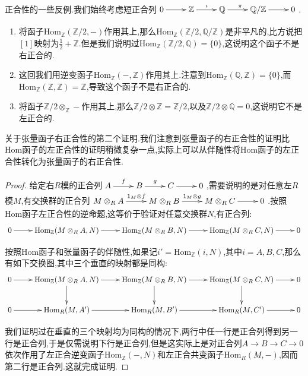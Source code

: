 正合性的一些反例.我们始终考虑短正合列$\xymatrix{0\ar[r]&\mathbb{Z}\ar[r]^{\iota}&\mathbb{Q}\ar[r]^{\pi}&\mathbb{Q}/\mathbb{Z}\ar[r]&0}$.
\begin{enumerate}
	\item 将函子$\mathrm{Hom}_{\mathbb{Z}}(\mathbb{Z}/2,-)$作用其上,那么$\mathrm{Hom}_{\mathbb{Z}}(\mathbb{Z}/2,\mathbb{Q}/\mathbb{Z})$是非平凡的,比方说把$[1]$映射为$\frac{1}{2}+\mathbb{Z}$.但是我们说明过$\mathrm{Hom}_{\mathbb{Z}}(\mathbb{Z}/2,\mathbb{Q})=\{0\}$,这说明这个函子不是右正合的.
	\item 这回我们用逆变函子$\mathrm{Hom}_{\mathbb{Z}}(-,\mathbb{Z})$作用其上.注意到$\mathrm{Hom}_{\mathbb{Z}}(\mathbb{Q},\mathbb{Z})=\{0\}$,而$\mathrm{Hom}_{\mathbb{Z}}(\mathbb{Z},\mathbb{Z})=\mathbb{Z}$,导致这个函子不是右正合的.
	\item 将函子$\mathbb{Z}/2\otimes_{\mathbb{Z}}-$作用其上,那么$\mathbb{Z}/2\otimes\mathbb{Z}=\mathbb{Z}/2$,以及$\mathbb{Z}/2\otimes\mathbb{Q}=0$,这说明它不是左正合的.
\end{enumerate}

关于张量函子右正合性的第二个证明.我们注意到张量函子的右正合性的证明比Hom函子的左正合性的证明稍微复杂一点,实际上可以从伴随性将Hom函子的左正合性转化为张量函子的右正合性.
\begin{proof}
	
	给定右$R$模的正合列$\xymatrix{A\ar[r]^f&B\ar[r]^g&C\ar[r]&0}$,需要说明的是对任意左$R$模$M$,有交换群的正合列$\xymatrix{M\otimes_RA\ar[r]^{1_M\otimes f}&M\otimes_RB\ar[r]^{1_M\otimes g}&M\otimes_RC\ar[r]&0}$.按照Hom函子左正合性的逆命题,这等价于验证对任意交换群$N$,有正合列:
	$$\xymatrix{0\ar[r]&\mathrm{Hom}_{\mathbb{Z}}(M\otimes_RA,N)\ar[r]&\mathrm{Hom}_{\mathbb{Z}}(M\otimes_RB,N)\ar[r]&\mathrm{Hom}_{\mathbb{Z}}(M\otimes_RC,N)\ar[r]&0}$$
	
	按照Hom函子和张量函子的伴随性,如果记$i'=\mathrm{Hom}_{\mathbb{Z}}(i,N)$,其中$i=A,B,C$,那么有如下交换图,其中三个垂直的映射都是同构:
	$$\xymatrix{0\ar[r]&\mathrm{Hom}_{\mathbb{Z}}(M\otimes_RA,N)\ar[d]\ar[r]&\mathrm{Hom}_{\mathbb{Z}}(M\otimes_RB,N)\ar[d]\ar[r]&\mathrm{Hom}_{\mathbb{Z}}(M\otimes_RC,N)\ar[d]\ar[r]&0\\ 0\ar[r]&\mathrm{Hom}_R(M,A')\ar[r]&\mathrm{Hom}_R(M,B')\ar[r]&\mathrm{Hom}_R(M,C')\ar[r]&0}$$
	
	我们证明过在垂直的三个映射均为同构的情况下,两行中任一行是正合列得到另一行是正合列,于是仅需说明下行是正合列,但是这实际上是对正合列$A\to B\to C\to0$依次作用了左正合逆变函子$\mathrm{Hom}_{\mathbb{Z}}(-,N)$和左正合共变函子$\mathrm{Hom}_R(M,-)$,因而第二行是正合列.这就完成证明.
\end{proof}

